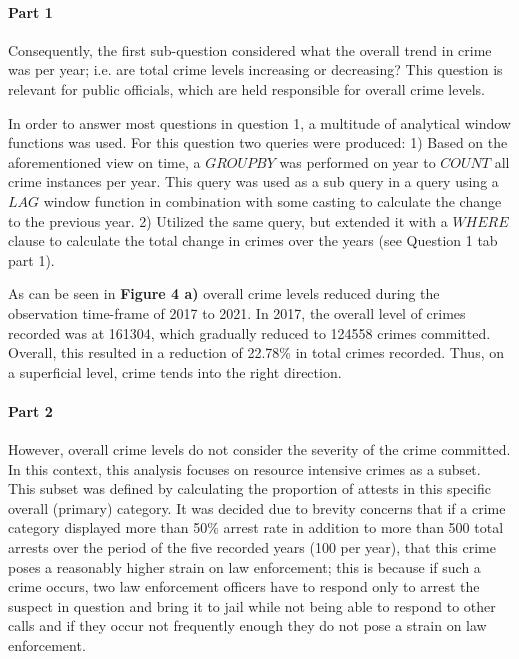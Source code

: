 \documentclass[a4paper]{article}
\begin{document}
\paragraph{Part 1} Consequently, the first sub-question considered what the overall trend in crime was per year; i.e. are total crime levels increasing or decreasing? This question is relevant for public officials, which are held responsible for overall crime levels. 

In order to answer most questions in question 1, a multitude of analytical window functions was used. For this question two queries were produced: 1) Based on the aforementioned view on time, a $GROUP BY$ was performed on year to $COUNT$ all crime instances per year. This query was used as a sub query in a query using a $LAG$ window function in combination with some casting to calculate the change to the previous year. 2) Utilized the same query, but extended it with a $WHERE$ clause to calculate the total change in crimes over the years (see Question 1 tab part 1).

As can be seen in \textbf{Figure 4 a)} overall crime levels reduced during the observation time-frame of 2017 to 2021. In 2017, the overall level of crimes recorded was at 161304, which gradually reduced to 124558 crimes committed. Overall, this resulted in a reduction of 22.78\% in total crimes recorded. Thus, on a superficial level, crime tends into the right direction. 


\paragraph{Part 2} However, overall crime levels do not consider the severity of the crime committed. In this context, this analysis focuses on resource intensive crimes as a subset. This subset was defined by calculating the proportion of attests in this specific overall (primary) category. It was decided due to brevity concerns that if a crime category displayed more than 50\% arrest rate in addition to more than 500 total arrests over the period of the five recorded years (100 per year), that this crime poses a reasonably higher strain on law enforcement; this is because if such a crime occurs, two law enforcement officers have to respond only to arrest the suspect in question and bring it to jail while not being able to respond to other calls and if they occur not frequently enough they do not pose a strain on law enforcement. 
\end{document}
